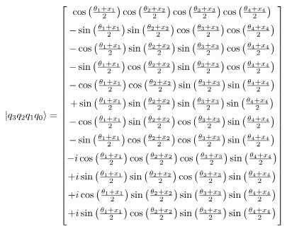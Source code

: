 \documentclass[12pt]{article}
\numberwithin{equation}{section}  %
\theoremstyle{definition}
\theoremstyle{plain}
\theoremstyle{remark}
\begin{document}
\begin{equation}
\ket{q_3q_2q_1q_0}=
\begin{bmatrix}
\cos\left(\frac{\theta_1+x_1}{2}\right)
\cos\left(\frac{\theta_2+x_2}{2}\right)
\cos\left(\frac{\theta_3+x_3}{2}\right)
\cos\left(\frac{\theta_4+x_4}{2}\right)
\\[6pt]
-\sin\left(\frac{\theta_1+x_1}{2}\right)
\sin\left(\frac{\theta_2+x_2}{2}\right)
\cos\left(\frac{\theta_3+x_3}{2}\right)
\cos\left(\frac{\theta_4+x_4}{2}\right)
\\[6pt]
-\cos\left(\frac{\theta_1+x_1}{2}\right)
\sin\left(\frac{\theta_2+x_2}{2}\right)
\sin\left(\frac{\theta_3+x_3}{2}\right)
\cos\left(\frac{\theta_4+x_4}{2}\right)
\\[6pt]
-\sin\left(\frac{\theta_1+x_1}{2}\right)
\cos\left(\frac{\theta_2+x_2}{2}\right)
\sin\left(\frac{\theta_3+x_3}{2}\right)
\cos\left(\frac{\theta_4+x_4}{2}\right)
\\[6pt]
-\cos\left(\frac{\theta_1+x_1}{2}\right)
\cos\left(\frac{\theta_2+x_2}{2}\right)
\sin\left(\frac{\theta_3+x_3}{2}\right)
\sin\left(\frac{\theta_4+x_4}{2}\right)
\\[6pt]
+\sin\left(\frac{\theta_1+x_1}{2}\right)
\sin\left(\frac{\theta_2+x_2}{2}\right)
\sin\left(\frac{\theta_3+x_3}{2}\right)
\sin\left(\frac{\theta_4+x_4}{2}\right)
\\[6pt]
-\cos\left(\frac{\theta_1+x_1}{2}\right)
\sin\left(\frac{\theta_2+x_2}{2}\right)
\cos\left(\frac{\theta_3+x_3}{2}\right)
\sin\left(\frac{\theta_4+x_4}{2}\right)
\\[6pt]
-\sin\left(\frac{\theta_1+x_1}{2}\right)
\cos\left(\frac{\theta_2+x_2}{2}\right)
\cos\left(\frac{\theta_3+x_3}{2}\right)
\sin\left(\frac{\theta_4+x_4}{2}\right)
\\[6pt]
-i\cos\left(\frac{\theta_1+x_1}{2}\right)
\cos\left(\frac{\theta_2+x_2}{2}\right)
\cos\left(\frac{\theta_3+x_3}{2}\right)
\sin\left(\frac{\theta_4+x_4}{2}\right)
\\[6pt]
+i\sin\left(\frac{\theta_1+x_1}{2}\right)
\sin\left(\frac{\theta_2+x_2}{2}\right)
\cos\left(\frac{\theta_3+x_3}{2}\right)
\sin\left(\frac{\theta_4+x_4}{2}\right)
\\[6pt]
+i\cos\left(\frac{\theta_1+x_1}{2}\right)
\sin\left(\frac{\theta_2+x_2}{2}\right)
\sin\left(\frac{\theta_3+x_3}{2}\right)
\sin\left(\frac{\theta_4+x_4}{2}\right)
\\[6pt]
+i\sin\left(\frac{\theta_1+x_1}{2}\right)
\cos\left(\frac{\theta_2+x_2}{2}\right)
\sin\left(\frac{\theta_3+x_3}{2}\right)
\sin\left(\frac{\theta_4+x_4}{2}\right)
\\[6pt]

\end{bmatrix}
\end{equation}
\end{document}
